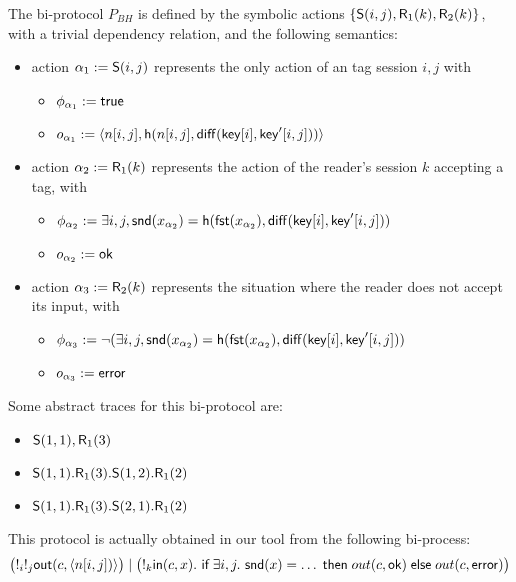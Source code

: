 \begin{example}
  \label{ex:basic-hash-bi-process}
  The bi-protocol $P_{BH}$ is defined by the symbolic actions
  $\{\textsf{S}(i,j),\textsf{R}_1(k),\textsf{R}_2(k)\}$, with a trivial dependency relation,
  and the following semantics:
    \begin{itemize}
      \item action $\alpha_1 := \textsf{S}(i,j)$ represents the only
        action of an tag session $i,j$ with
        \begin{itemize}
          \item $\phi_{\alpha_1} := \textsf{true}$
          \item $o_{\alpha_1} := \langle n[i,j], \mathsf{h}(n[i,j],\mathsf{diff}(\mathsf{key}[i],\mathsf{key}'[i,j])) \rangle$
        \end{itemize}
      \item action $\alpha_2 := \textsf{R}_1(k)$ represents the action
        of the reader's session $k$ accepting a tag, with
        \begin{itemize}
          \item $\phi_{\alpha_2} := \exists i,j, \mathsf{snd}(x_{\alpha_2}) =
            \mathsf{h}(\mathsf{fst}(x_{\alpha_2}),\mathsf{diff}(\mathsf{key}[i],\mathsf{key}'[i,j]))$
          \item $o_{\alpha_2} := \mathsf{ok}$
        \end{itemize}
      \item action $\alpha_3 := \textsf{R}_2(k)$ represents the situation
        where the reader does not accept its input, with
        \begin{itemize}
          \item $\phi_{\alpha_3} := \neg (\exists i,j, \mathsf{snd}(x_{\alpha_2}) =  \mathsf{h}(\mathsf{fst}(x_{\alpha_2}),\mathsf{diff}(\mathsf{key}[i],\mathsf{key}'[i,j]))$
          \item $o_{\alpha_3} := \mathsf{error}$
        \end{itemize}
    \end{itemize}
  Some abstract traces for this bi-protocol are:
  \begin{itemize}
    \item $\textsf{S}(1,1),\textsf{R}_1(3)$
    \item $\textsf{S}(1,1).\textsf{R}_1(3).\textsf{S}(1,2).\textsf{R}_1(2)$
    \item $\textsf{S}(1,1).\textsf{R}_1(3).\textsf{S}(2,1).\textsf{R}_1(2)$
  \end{itemize}
  This protocol is actually obtained in our tool from the following
  bi-process:
  $$\bigl(!_i !_j \mathsf{out}(c,\langle  n[i,j]) \rangle\bigr) \mid
   \bigl(!_k \mathsf{in}(c,x).~ \textsf{if}\; \exists i,j.~ \mathsf{snd}(x) = \ldots \;\textsf{then}\;
    out(c,\mathsf{ok}) \;\textsf{else}\; out(c,\mathsf{error})\bigr)$$
\end{example}

